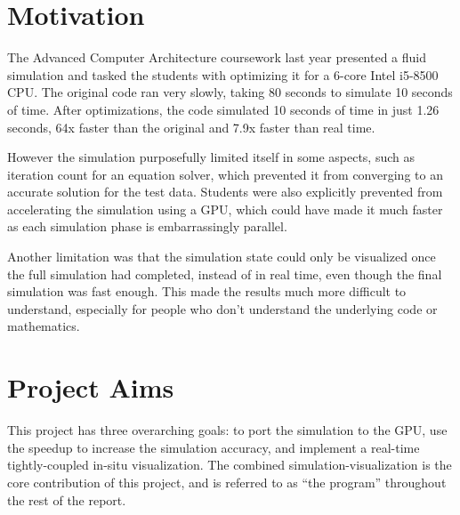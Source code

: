 \section{Motivation}
The Advanced Computer Architecture coursework last year presented a fluid simulation and tasked the students with optimizing it for a 6-core Intel i5-8500 CPU\cite{modules:CS257Coursework}.
The original code ran very slowly, taking 80 seconds to simulate 10 seconds of time. %
After optimizations, the code simulated 10 seconds of time in just 1.26 seconds, 64x faster than the original and 7.9x faster than real time.\cite{modules:aca257submission}

However the simulation purposefully limited itself in some aspects, such as iteration count for an equation solver, which prevented it from converging to an accurate solution for the test data.
Students were also explicitly prevented from accelerating the simulation using a GPU, which could have made it much faster as each simulation phase is embarrassingly parallel.

Another limitation was that the simulation state could only be visualized once the full simulation had completed,
instead of in real time, even though the final simulation was fast enough.
This made the results much more difficult to understand, especially for people who don't understand the underlying code or mathematics.

\section{Project Aims}
This project has three overarching goals: to port the simulation to the GPU, use the speedup to increase the simulation accuracy, and implement a real-time tightly-coupled in-situ visualization.
The combined simulation-visualization is the core contribution of this project, and is referred to as ``the program'' throughout the rest of the report.


